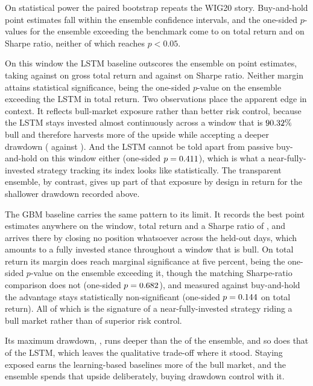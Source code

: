 On statistical power the paired bootstrap repeats the WIG20 story. Buy-and-hold point estimates fall within the ensemble confidence intervals, and the one-sided $p$-values for the ensemble exceeding the benchmark come to \FtsePvsBH{} on total return and \FtsePvsBHsharpe{} on Sharpe ratio, neither of which reaches $p < 0.05$.

On this window the LSTM baseline outscores the ensemble on point estimates, taking \FtseLSTMtest{} against \FtseTRtest{} on gross total return and \FtseLSTMsharpe{} against \FtseSharpe{} on Sharpe ratio. Neither margin attains statistical significance, \FtsePensVsLSTM{} being the one-sided $p$-value on the ensemble exceeding the LSTM in total return. Two observations place the apparent edge in context. It reflects bull-market exposure rather than better risk control, because the LSTM stays invested almost continuously across a window that is $90.32\%{}$ bull and therefore harvests more of the upside while accepting a deeper drawdown (\FtseLSTMmdd{} against \FtseMDD{}). And the LSTM cannot be told apart from passive buy-and-hold on this window either (one-sided $p = 0.411{}$), which is what a near-fully-invested strategy tracking its index looks like statistically. The transparent ensemble, by contrast, gives up part of that exposure by design in return for the shallower drawdown recorded above.

The GBM baseline carries the same pattern to its limit. It records the best point estimates anywhere on the window, \FtseGBMtest{} total return and a Sharpe ratio of \FtseGBMsharpe{}, and arrives there by closing no position whatsoever across the \FtseOOSDays{} held-out days, which amounts to a fully invested stance throughout a window that is \FtseRegBullShare{} bull. On total return its margin does reach marginal significance at five percent, \FtsePensVsGBM{} being the one-sided $p$-value on the ensemble exceeding it, though the matching Sharpe-ratio comparison does not (one-sided $p = 0.682{}$), and measured against buy-and-hold the advantage stays statistically non-significant (one-sided $p = 0.144{}$ on total return). All of which is the signature of a near-fully-invested strategy riding a bull market rather than of superior risk control.

Its maximum drawdown, \FtseGBMmdd{}, runs deeper than the \FtseMDD{} of the ensemble, and so does that of the LSTM, which leaves the qualitative trade-off where it stood. Staying exposed earns the learning-based baselines more of the bull market, and the ensemble spends that upside deliberately, buying drawdown control with it.

